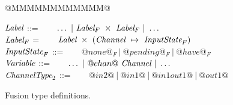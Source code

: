 
\begin{figure}

\begin{tabbing}
@MMMMMMMMMMMM@   \TABDEF \kill

$\textit{Label}$        \> ::=  \> ~~~ $\ldots ~|~\textit{Label}_F~\times~\textit{Label}_F ~|~ \ldots$ \\
$\textit{Label}_F$      \> =    \> ~~~ $\textit{Label}~\times~(\textit{Channel} ~\mapsto~ \textit{InputState}_F)$  \\
$\textit{InputState}_F$ \> ::=  \> ~~~ $@none@_F ~|~ @pending@_F ~|~ @have@_F$    \\
$\textit{Variable}$          \> ::=  \> ~~~ $\ldots ~|~@chan@~\textit{Channel} ~|~ \ldots$ \\
$\textit{ChannelType}_2$   \> ::=  \> ~~~ $@in2@~|~@in1@~|~@in1out1@~|~@out1@$
\end{tabbing}
\caption{Fusion type definitions.}
\label{fig:Fusion:Types}
\end{figure}


